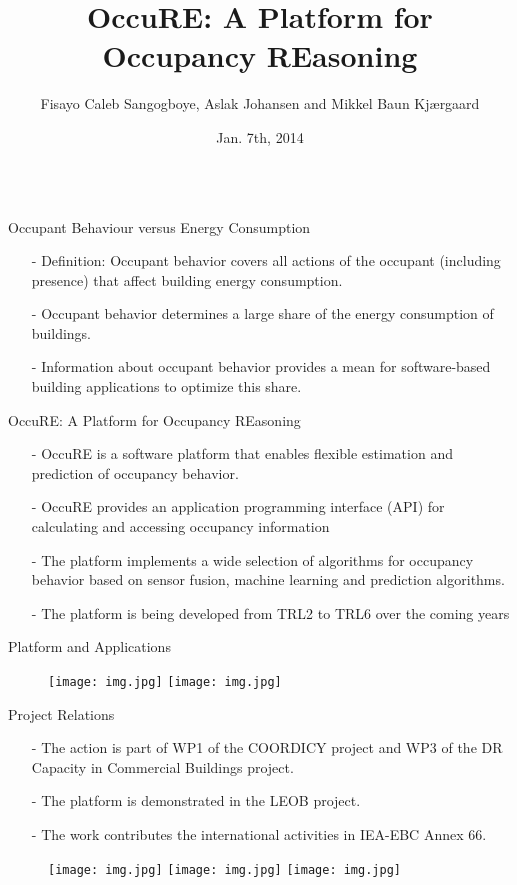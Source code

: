 \documentclass[final,hyperref={pdfpagelabels=false},11pt]{beamer}
\title{OccuRE: A Platform for Occupancy REasoning}
\author{Fisayo Caleb Sangogboye, Aslak Johansen and Mikkel Baun Kjærgaard}
\institute[University of Southern Denmark]{Centre for Smart Energy Solutions\\ The Maersk Mc-Kinney Moller Institute\\ University of Southern Denmark\\ Odense, Denmark}
\date[Jan. 7th, 2014]{Jan. 7th, 2014}
\begin{document}
\begin{frame}[t]
\begin{columns}[T]
\begin{column}{0.88\paperwidth} %

\begin{block}{Occupant Behaviour versus Energy Consumption}
\begin{itemize}
  \item[-] Definition: Occupant behavior covers all actions of the occupant (including presence) that affect building energy consumption.
  \item[-] Occupant behavior determines a large share of the energy consumption of buildings.
  \item[-] Information about occupant behavior provides a mean for software-based building applications to optimize this share.
\end{itemize}
\end{block}
\begin{block}{OccuRE: A Platform for Occupancy REasoning}
\begin{itemize}
  \item[-] OccuRE is a software platform that enables flexible estimation and prediction of occupancy behavior.
  \item[-] OccuRE provides an application programming interface (API) for calculating and accessing occupancy information
  \item[-] The platform implements a wide selection of algorithms for occupancy behavior based on sensor fusion, machine learning and prediction algorithms.
  \item[-] The platform is being developed from TRL2 to TRL6 over the coming years
\end{itemize}
\end{block}
\begin{block}{Platform and Applications}
\begin{figure}
\centering
\texttt{[image: img.jpg]}
\texttt{[image: img.jpg]}
\end{figure}
\end{block}
\begin{block}{Project Relations}
\begin{itemize}
  \item[-] The action is part of WP1 of the COORDICY project and WP3 of the DR Capacity in Commercial Buildings project.
  \item[-] The platform is demonstrated in the LEOB project.
  \item[-] The work contributes the international activities in IEA-EBC Annex 66.
\end{itemize}
\begin{figure}
\centering
\texttt{[image: img.jpg]}
\texttt{[image: img.jpg]}
\texttt{[image: img.jpg]}
\end{figure}
\end{block}



\end{column}
\end{columns}
\end{frame}
\end{document}
